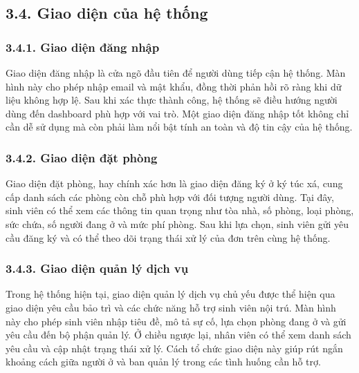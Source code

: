 \documentclass[12pt]{article}
\begin{document}
\subsection*{3.4. Giao diện của hệ thống}

\subsubsection*{3.4.1. Giao diện đăng nhập}

Giao diện đăng nhập là cửa ngõ đầu tiên để người dùng tiếp cận hệ thống. Màn hình này cho phép nhập email và mật khẩu, đồng thời phản hồi rõ ràng khi dữ liệu không hợp lệ. Sau khi xác thực thành công, hệ thống sẽ điều hướng người dùng đến dashboard phù hợp với vai trò. Một giao diện đăng nhập tốt không chỉ cần dễ sử dụng mà còn phải làm nổi bật tính an toàn và độ tin cậy của hệ thống.

\subsubsection*{3.4.2. Giao diện đặt phòng}

Giao diện đặt phòng, hay chính xác hơn là giao diện đăng ký ở ký túc xá, cung cấp danh sách các phòng còn chỗ phù hợp với đối tượng người dùng. Tại đây, sinh viên có thể xem các thông tin quan trọng như tòa nhà, số phòng, loại phòng, sức chứa, số người đang ở và mức phí phòng. Sau khi lựa chọn, sinh viên gửi yêu cầu đăng ký và có thể theo dõi trạng thái xử lý của đơn trên cùng hệ thống.

\subsubsection*{3.4.3. Giao diện quản lý dịch vụ}

Trong hệ thống hiện tại, giao diện quản lý dịch vụ chủ yếu được thể hiện qua giao diện yêu cầu bảo trì và các chức năng hỗ trợ sinh viên nội trú. Màn hình này cho phép sinh viên nhập tiêu đề, mô tả sự cố, lựa chọn phòng đang ở và gửi yêu cầu đến bộ phận quản lý. Ở chiều ngược lại, nhân viên có thể xem danh sách yêu cầu và cập nhật trạng thái xử lý. Cách tổ chức giao diện này giúp rút ngắn khoảng cách giữa người ở và ban quản lý trong các tình huống cần hỗ trợ.
\end{document}
